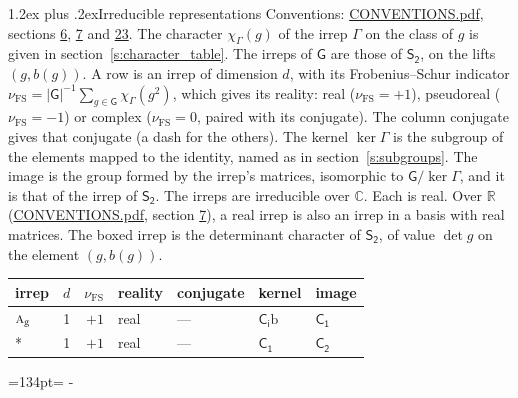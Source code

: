 \documentclass[10pt,a4paper]{article}
\makeatletter
\renewcommand\section{\@startsection{section}{1}{\z@}{-3ex plus -1ex minus -.2ex}%
  {1.2ex plus .2ex}{\normalfont\large\sffamily\bfseries\color{parttitle}}}
\newcommand{\needspace}[1]{\par\penalty-100\begingroup\dimen0=#1\relax\dimen2=\pagegoal
  \advance\dimen2-\pagetotal\ifdim\dimen0>\dimen2\relax\ifdim\dimen2>0pt\vfil\break\fi\fi
  \endgroup}
\numberwithin{equation}{section}
\newcommand{\grp}[1]{\mathsf{#1}}
\newcommand{\irr}[1]{\text{\normalfont\scshape #1}}
\newcommand{\detbox}[1]{{\setlength{\fboxsep}{1pt}\fbox{#1}}}
\newcommand{\ptag}[1]{\mathrm{#1}}
\newcommand{\irchar}[1]{\chi_{#1}}
\newcommand{\fsind}{\nu_{\mathrm{FS}}}
\newcommand{\secondclass}{\mathrm{b}}
\makeatother
\begin{document}
\section{Irreducible representations}\label{s:irreps}
Conventions: \href{../../CONVENTIONS.pdf}{CONVENTIONS.pdf}, sections \href{../../../rotation/CONVENTIONS.pdf\#conv.6}{6}, \href{../../../rotation/CONVENTIONS.pdf\#conv.7}{7} and \href{../../CONVENTIONS.pdf\#conv.23}{23}.
\leavevmode\label{n:function.character}\label{n:irrep.Gamma}The character $\irchar{\Gamma}(g)$ of the irrep $\Gamma$ on the class of $g$ is given in section~\ref{s:character_table}. The irreps of $\grp{G}$ are those of \href{../../../rotation/data/pdf/S2.pdf}{$\grp{S_{2}}$}, on the lifts $(g, b(g))$.
\leavevmode\label{n:index.dimension}\label{n:index.frobenius}\label{n:head.irrep}\label{n:head.reality}A row is an irrep of dimension $d$, with its Frobenius--Schur indicator $\fsind = |\grp{G}|^{-1}\allowbreak\sum_{g\in\grp{G}}\irchar{\Gamma}(g^2)$, which gives its reality: real ($\fsind = +1$), pseudoreal ($\fsind = -1$) or complex ($\fsind = 0$, paired with its conjugate). \label{n:head.conjugate}The column conjugate gives that conjugate (a dash for the others). \label{n:head.kernel}The kernel $\ker\Gamma$ is the subgroup of the elements mapped to the identity, named as in section~\ref{s:subgroups}. \label{n:head.image}The image is the group formed by the irrep's matrices, isomorphic to $\grp{G}/\ker\Gamma$, and it is that of the irrep of \href{../../../rotation/data/pdf/S2.pdf}{$\grp{S_{2}}$}. The irreps are irreducible over $\mathbb{C}$. Each is real. Over $\mathbb{R}$ (\href{../../CONVENTIONS.pdf}{CONVENTIONS.pdf}, section \href{../../../rotation/CONVENTIONS.pdf\#conv.7}{7}), a real irrep is also an irrep in a basis with real matrices. \label{n:mark.determinant}The boxed irrep is the determinant character of \href{../../../rotation/data/pdf/S2.pdf}{$\grp{S_{2}}$}, of value $\det g$ on the element $(g, b(g))$.
\setlength{\emergencystretch}{2em}\par\setlength{\emergencystretch}{0pt}
{\small\renewcommand{\arraystretch}{1.25}\begin{longtable}{@{}lrrllll@{}}\toprule
irrep & $d$ & $\fsind$ & reality & conjugate & kernel & image\\\midrule\endhead
\bottomrule\endfoot\endlastfoot
$\irr{a}_{\ptag{g}}$ & 1 & $+1$ & real & --- & \href{S2b.pdf}{$\grp{C_{i}}\secondclass$} & \href{../../../rotation/data/pdf/C1.pdf}{$\grp{C_{1}}$}\\*
\detbox{$\irr{a}_{\ptag{u}}$} & 1 & $+1$ & real & --- & \href{C1.pdf}{$\grp{C_{1}}$} & \href{../../../rotation/data/pdf/C2.pdf}{$\grp{C_{2}}$}\\
\bottomrule\end{longtable}}
\needspace{134pt}
\end{document}
